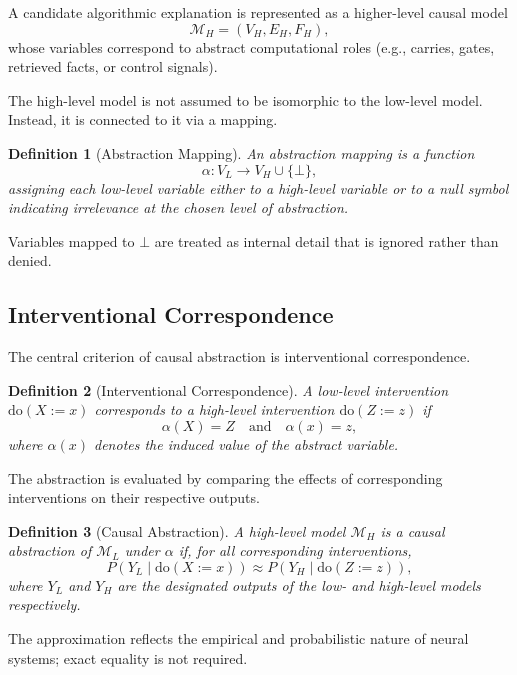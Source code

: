 \documentclass[11pt]{article}
\newtheorem{definition}{Definition}
\begin{document}
A candidate algorithmic explanation is represented as a higher-level causal model
\[
\mathcal{M}_H = (V_H, E_H, F_H),
\]
whose variables correspond to abstract computational roles (e.g., carries, gates, retrieved facts, or control signals).

The high-level model is not assumed to be isomorphic to the low-level model. Instead, it is connected to it via a mapping.

\begin{definition}[Abstraction Mapping]
An abstraction mapping is a function
\[
\alpha : V_L \rightarrow V_H \cup \{\bot\},
\]
assigning each low-level variable either to a high-level variable or to a null symbol indicating irrelevance at the chosen level of abstraction.
\end{definition}

Variables mapped to $\bot$ are treated as internal detail that is ignored rather than denied.

\subsection{Interventional Correspondence}

The central criterion of causal abstraction is interventional correspondence.

\begin{definition}[Interventional Correspondence]
A low-level intervention $\mathrm{do}(X := x)$ corresponds to a high-level intervention $\mathrm{do}(Z := z)$ if
\[
\alpha(X) = Z
\quad \text{and} \quad
\alpha(x) = z,
\]
where $\alpha(x)$ denotes the induced value of the abstract variable.
\end{definition}

The abstraction is evaluated by comparing the effects of corresponding interventions on their respective outputs.

\begin{definition}[Causal Abstraction]
A high-level model $\mathcal{M}_H$ is a causal abstraction of $\mathcal{M}_L$ under $\alpha$ if, for all corresponding interventions,
\[
P(Y_L \mid \mathrm{do}(X := x)) \approx P(Y_H \mid \mathrm{do}(Z := z)),
\]
where $Y_L$ and $Y_H$ are the designated outputs of the low- and high-level models respectively.
\end{definition}

The approximation reflects the empirical and probabilistic nature of neural systems; exact equality is not required.
\end{document}
